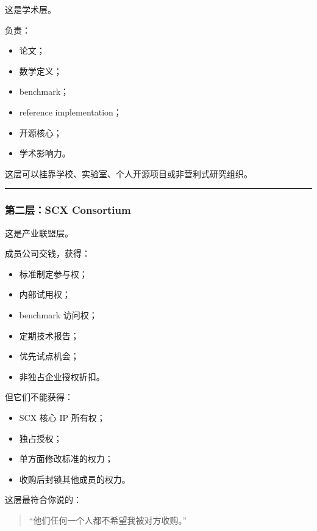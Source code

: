 \documentclass[
  12pt,
]{ctexart}
\providecommand{\tightlist}{%
  \setlength{\itemsep}{0pt}\setlength{\parskip}{0pt}}
\begin{document}
这是学术层。

负责：

\begin{itemize}
\tightlist
\item
  论文；
\item
  数学定义；
\item
  benchmark；
\item
  reference implementation；
\item
  开源核心；
\item
  学术影响力。
\end{itemize}

这层可以挂靠学校、实验室、个人开源项目或非营利式研究组织。

\begin{center}\rule{0.5\linewidth}{0.5pt}\end{center}

\subsubsection{第二层：SCX
Consortium}\label{ux7b2cux4e8cux5c42scx-consortium}

这是产业联盟层。

成员公司交钱，获得：

\begin{itemize}
\tightlist
\item
  标准制定参与权；
\item
  内部试用权；
\item
  benchmark 访问权；
\item
  定期技术报告；
\item
  优先试点机会；
\item
  非独占企业授权折扣。
\end{itemize}

但它们不能获得：

\begin{itemize}
\tightlist
\item
  SCX 核心 IP 所有权；
\item
  独占授权；
\item
  单方面修改标准的权力；
\item
  收购后封锁其他成员的权力。
\end{itemize}

这层最符合你说的：

\begin{quote}
``他们任何一个人都不希望我被对方收购。''
\end{quote}
\end{document}
